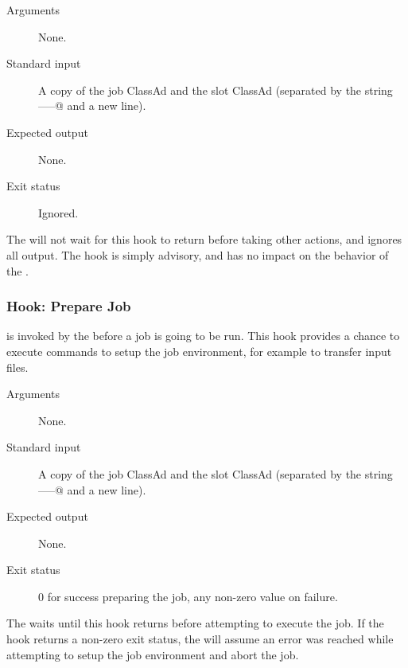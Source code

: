 \begin{description}
\item[Arguments]
  None.

\item[Standard input]
  A copy of the job ClassAd and the slot ClassAd
  (separated by the string \verb@-----@ and a new line).

\item[Expected output]
  None.

\item[Exit status]
  Ignored.
\end{description}

The  will not wait for this hook to return before
taking other actions, and ignores all output.
The hook is simply advisory, and has no impact on the behavior of the
.


\subsubsection{\label{sec:job-hooks-prepare-job}
Hook: Prepare Job}

 is invoked by the  before
a job is going to be run.
This hook provides a chance to execute commands to setup the job
environment, for example to transfer input files.

\begin{description}
\item[Arguments]
  None.

\item[Standard input]
  A copy of the job ClassAd and the slot ClassAd
  (separated by the string \verb@-----@ and a new line).

\item[Expected output]
  None.

\item[Exit status]
  0 for success preparing the job, any non-zero value on failure.
\end{description}

The  waits until this hook returns before
attempting to execute the job.
If the hook returns a non-zero exit status, the  will
assume an error was reached while attempting to setup the job
environment and abort the job.


